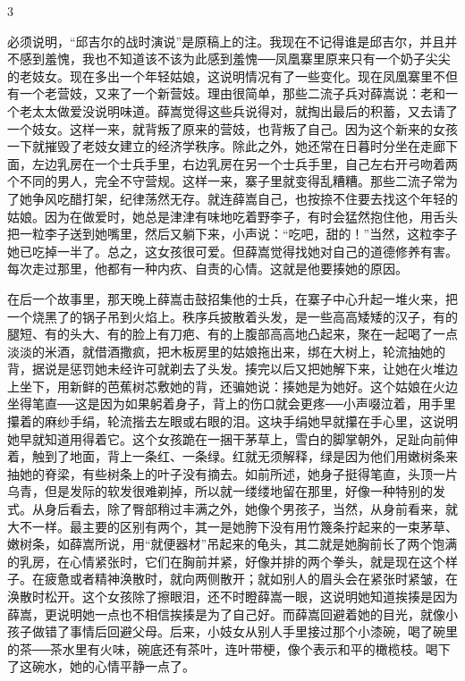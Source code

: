 3 

必须说明，“邱吉尔的战时演说”是原稿上的注。我现在不记得谁是邱吉尔，并且并不感到羞愧，我也不知道该不该为此感到羞愧──凤凰寨里原来只有一个奶子尖尖的老妓女。现在多出一个年轻姑娘，这说明情况有了一些变化。现在凤凰寨里不但有一个老营妓，又来了一个新营妓。理由很简单，那些二流子兵对薛嵩说：老和一个老太太做爱没说明味道。薛嵩觉得这些兵说得对，就掏出最后的积蓄，又去请了一个妓女。这样一来，就背叛了原来的营妓，也背叛了自己。因为这个新来的女孩一下就摧毁了老妓女建立的经济学秩序。除此之外，她还常在日暮时分坐在走廊下面，左边乳房在一个士兵手里，右边乳房在另一个士兵手里，自己左右开弓吻着两个不同的男人，完全不守营规。这样一来，寨子里就变得乱糟糟。那些二流子常为了她争风吃醋打架，纪律荡然无存。就连薛嵩自己，也按捺不住要去找这个年轻的姑娘。因为在做爱时，她总是津津有味地吃着野李子，有时会猛然抱住他，用舌头把一粒李子送到她嘴里，然后又躺下来，小声说：“吃吧，甜的！”当然，这粒李子她已吃掉一半了。总之，这女孩很可爱。但薛嵩觉得找她对自己的道德修养有害。每次走过那里，他都有一种内疚、自责的心情。这就是他要揍她的原因。 

在后一个故事里，那天晚上薛嵩击鼓招集他的士兵，在寨子中心升起一堆火来，把一个烧黑了的锅子吊到火焰上。秩序兵披散着头发，是一些高高矮矮的汉子，有的腿短、有的头大、有的脸上有刀疤、有的上腹部高高地凸起来，聚在一起喝了一点淡淡的米酒，就借酒撒疯，把木板房里的姑娘拖出来，绑在大树上，轮流抽她的背，据说是惩罚她未经许可就剃去了头发。揍完以后又把她解下来，让她在火堆边上坐下，用新鲜的芭蕉树芯敷她的背，还骗她说：揍她是为她好。这个姑娘在火边坐得笔直──这是因为如果躬着身子，背上的伤口就会更疼──小声啜泣着，用手里攥着的麻纱手绢，轮流揩去左眼或右眼的泪。这块手绢她早就攥在手心里，这说明她早就知道用得着它。这个女孩跪在一捆干茅草上，雪白的脚掌朝外，足趾向前伸着，触到了地面，背上一条红、一条绿。红就无须解释，绿是因为他们用嫩树条来抽她的脊梁，有些树条上的叶子没有摘去。如前所述，她身子挺得笔直，头顶一片乌青，但是发际的软发很难剃掉，所以就一缕缕地留在那里，好像一种特别的发式。从身后看去，除了臀部稍过丰满之外，她像个男孩子，当然，从身前看来，就大不一样。最主要的区别有两个，其一是她胯下没有用竹篾条拧起来的一束茅草、嫩树条，如薛嵩所说，用“就便器材”吊起来的龟头，其二就是她胸前长了两个饱满的乳房，在心情紧张时，它们在胸前并紧，好像并排的两个拳头，就是现在这个样子。在疲惫或者精神涣散时，就向两侧散开；就如别人的眉头会在紧张时紧皱，在涣散时松开。这个女孩除了擦眼泪，还不时瞪薛嵩一眼，这说明她知道挨揍是因为薛嵩，更说明她一点也不相信挨揍是为了自己好。而薛嵩回避着她的目光，就像小孩子做错了事情后回避父母。后来，小妓女从别人手里接过那个小漆碗，喝了碗里的茶──茶水里有火味，碗底还有茶叶，连叶带梗，像个表示和平的橄榄枝。喝下了这碗水，她的心情平静一点了。 

